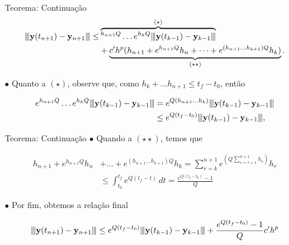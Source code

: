 \documentclass{beamer}
\newcommand{\vertiii}[1]{{\left\vert\kern-0.25ex\left\vert\kern-0.25ex\left\vert #1 
    \right\vert\kern-0.25ex\right\vert\kern-0.25ex\right\vert}}
\theoremstyle{plain}
\theoremstyle{definition}
\begin{document}

\begin{frame}{Teorema: Continuação}
    \begin{align*}
        \vertiii{\mathbf{y}(t_{n+1})-\mathbf{y}_{n+1}} \leq & \overbrace{^{h_{n+1}Q} \dots e^{h_{k}Q} \vertiii{\mathbf{y}(t_{k-1})-\mathbf{y}_{k-1}}}^{(\star)} \\
                                                            &+ \underbrace{c' h^p (h_{n+1} + e^{h_{n+1}Q}h_n + \dots + e^{(h_{n+1} \dots h_{k+1})Q}h_k)}_{(\star \star)}.
    \end{align*}

    \phantom{aa} $\bullet$ Quanto a $(\star)$, observe que, como $h_k + \dots h_{n+1} \leq t_f - t_0$, então

    \begin{align*}
      e^{h_{n+1}Q} \dots e^{h_{k}Q} \vertiii{\mathbf{y}(t_{k-1})-\mathbf{y}_{k-1}} &= e^{Q(h_{n+1} \dots h_k)} \vertiii{\mathbf{y}(t_{k-1})-\mathbf{y}_{k-1}} \\
                                                                                   &\leq e^{Q(t_f - t_0)} \vertiii{\mathbf{y}(t_{k-1})-\mathbf{y}_{k-1}},
    \end{align*}
\end{frame}



\begin{frame}{Teorema: Continuação}
    \noindent
    \phantom{aa} $\bullet$ Quando a $(\star \star)$, temos que

    

    \[
        \begin{split}
            h_{n+1} + e^{h_{n+1}Q}h_n &+ \dots + e^{(h_{n+1} \dots h_{k+1})Q}h_k = 
            \sum_{r = k}^{n+1}e^{\left( Q \sum_{s = r + 1}^{n+1}h_s \right)} h_r \\
            &\leq \int_{t_0}^{t_f} e^{Q(t_f - t)} \, dt = \frac{e^{Q(t_f - t_0)} - 1}{Q}
        \end{split}
    \]

    \phantom{aa} $\bullet$ Por fim, obtemos a relação final


    \[
      \vertiii{  \mathbf{y}(t_{n+1})-\mathbf{y}_{n+1} } \leq e^{Q(t_{f}-t_{0})} \vertiii{ \mathbf{y}(t_{k-1})-\mathbf{y}_{k-1} }
      +\frac{e^{Q(t_{f}-t_{0})}-1}{Q} c' h^{p}
    \]
\end{frame}
\end{document}
